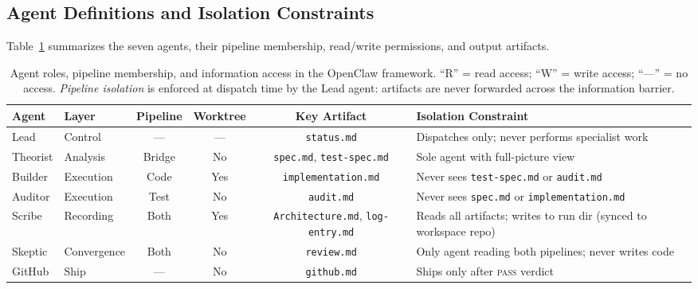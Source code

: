 \subsection{Agent Definitions and Isolation Constraints}
\label{sec:agents}

Table~\ref{tab:agents} summarizes the seven agents, their pipeline
membership, read/write permissions, and output artifacts.

\begin{table}[!t]
\centering
\caption{%
  Agent roles, pipeline membership, and information access in the
  OpenClaw framework. ``R'' = read access; ``W'' = write access;
  ``---'' = no access. \emph{Pipeline isolation} is enforced at
  dispatch time by the Lead agent: artifacts are never forwarded
  across the information barrier.
}
\label{tab:agents}
\small
\begin{tabular}{@{}llcccp{4.2cm}@{}}
\toprule
\textbf{Agent} & \textbf{Layer} & \textbf{Pipeline} &
  \textbf{Worktree} & \textbf{Key Artifact} &
  \textbf{Isolation Constraint} \\
\midrule
Lead      & Control     & ---       & ---  & \texttt{status.md}
  & Dispatches only; never performs specialist work \\
Theorist  & Analysis    & Bridge    & No   & \texttt{spec.md}, \texttt{test-spec.md}
  & Sole agent with full-picture view \\
Builder   & Execution   & Code      & Yes  & \texttt{implementation.md}
  & Never sees \texttt{test-spec.md} or \texttt{audit.md} \\
Auditor   & Execution   & Test      & No   & \texttt{audit.md}
  & Never sees \texttt{spec.md} or \texttt{implementation.md} \\
Scribe    & Recording   & Both      & Yes  & \texttt{Architecture.md}, \texttt{log-entry.md}
  & Reads all artifacts; writes to run dir (synced to workspace repo) \\
Skeptic   & Convergence & Both      & No   & \texttt{review.md}
  & Only agent reading both pipelines; never writes code \\
GitHub    & Ship        & ---       & No   & \texttt{github.md}
  & Ships only after \textsc{pass} verdict \\
\bottomrule
\end{tabular}
\end{table}


